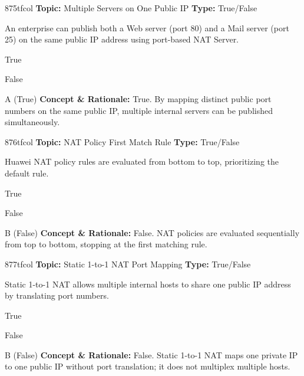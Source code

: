 \begin{qcard}{875}{tfcol}
\textcolor{darkslate!75}{\small\textbf{Topic:} Multiple Servers on One Public IP \hfill \textbf{Type:} True/False}\vspace{0.4em}\par
An enterprise can publish both a Web server (port 80) and a Mail server (port 25) on the same public IP address using port-based NAT Server.
\begin{qoptions}
\item True
\item False
\end{qoptions}
\end{qcard}
\nopagebreak
\begin{explainbox}{A (True)}
\textbf{Concept \& Rationale:} True. By mapping distinct public port numbers on the same public IP, multiple internal servers can be published simultaneously.
\end{explainbox}

\begin{qcard}{876}{tfcol}
\textcolor{darkslate!75}{\small\textbf{Topic:} NAT Policy First Match Rule \hfill \textbf{Type:} True/False}\vspace{0.4em}\par
Huawei NAT policy rules are evaluated from bottom to top, prioritizing the default rule.
\begin{qoptions}
\item True
\item False
\end{qoptions}
\end{qcard}
\nopagebreak
\begin{explainbox}{B (False)}
\textbf{Concept \& Rationale:} False. NAT policies are evaluated sequentially from top to bottom, stopping at the first matching rule.
\end{explainbox}

\begin{qcard}{877}{tfcol}
\textcolor{darkslate!75}{\small\textbf{Topic:} Static 1-to-1 NAT Port Mapping \hfill \textbf{Type:} True/False}\vspace{0.4em}\par
Static 1-to-1 NAT allows multiple internal hosts to share one public IP address by translating port numbers.
\begin{qoptions}
\item True
\item False
\end{qoptions}
\end{qcard}
\nopagebreak
\begin{explainbox}{B (False)}
\textbf{Concept \& Rationale:} False. Static 1-to-1 NAT maps one private IP to one public IP without port translation; it does not multiplex multiple hosts.
\end{explainbox}

